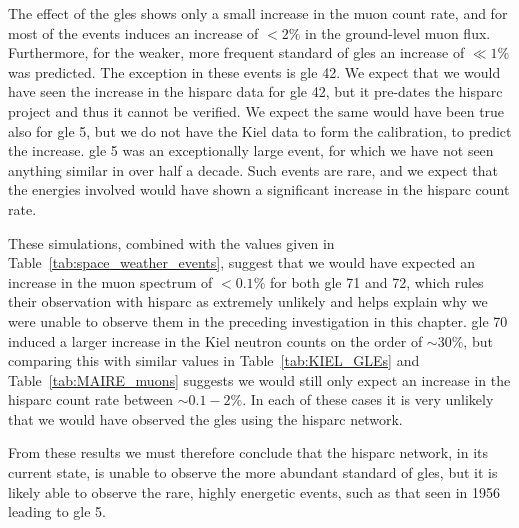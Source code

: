 
The effect of the \glspl{gle} shows only a small increase in the muon count rate, and for most of the events induces an increase of $< 2 \%$ in the ground-level muon flux. Furthermore, for the weaker, more frequent standard of \glspl{gle} an increase of $\ll 1\%$ was predicted. The exception in these events is \gls{gle} 42. We expect that we would have seen the increase in the \gls{hisparc} data for \gls{gle} 42, but it pre-dates the \gls{hisparc} project and thus it cannot be verified. We expect the same would have been true also for \gls{gle} 5, but we do not have the Kiel data to form the calibration, to predict the increase. \gls{gle} 5 was an exceptionally large event, for which we have not seen anything similar in over half a decade. Such events are rare, and we expect that the energies involved would have shown a significant increase in the \gls{hisparc} count rate.

These simulations, combined with the values given in Table~\ref{tab:space_weather_events}, suggest that we would have expected an increase in the muon spectrum of $< 0.1\%$ for both \gls{gle} 71 and 72, which rules their observation with \gls{hisparc} as extremely unlikely and helps explain why we were unable to observe them in the preceding investigation in this chapter. \gls{gle} 70 induced a larger increase in the Kiel neutron counts on the order of $\sim 30\%$, but comparing this with similar values in Table~\ref{tab:KIEL_GLEs} and Table~\ref{tab:MAIRE_muons} suggests we would still only expect an increase in the \gls{hisparc} count rate between $\sim 0.1 - 2 \%$. In each of these cases it is very unlikely that we would have observed the \glspl{gle} using the \gls{hisparc} network.

From these results we must therefore conclude that the \gls{hisparc} network, in its current state, is unable to observe the more abundant standard of \glspl{gle}, but it is likely able to observe the rare, highly energetic events, such as that seen in 1956 leading to \gls{gle} 5.



